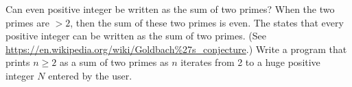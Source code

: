   Can even positive integer be written as the sum of two primes?
  When the two primes are $> 2$, then the sum of these two primes
  is even.
  The  states that
  every positive integer can be written as the sum of two primes.
  (See \url{https://en.wikipedia.org/wiki/Goldbach%27s_conjecture}.)
  Write a program that prints $n \geq 2$ as a sum of two primes as $n$
  iterates from 2 to a huge positive integer $N$ entered by the user.  
